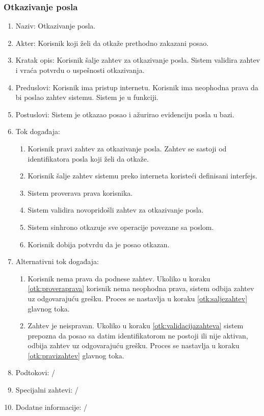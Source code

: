 \documentclass[12pt,oneside]{memoir}
\begin{document}
\subsubsection{Otkazivanje posla}
\begin{enumerate}
\item Naziv: Otkazivanje posla.
\item Akter: Korisnik koji želi da otkaže prethodno zakazani posao.
\item Kratak opis: Korisnik šalje zahtev za otkazivanje posla. Sistem validira zahtev i vraća potvrdu o uspešnosti otkazivanja.
\item Preduslovi: Korisnik ima pristup internetu. Korisnik ima neophodna prava da bi poslao zahtev sistemu. Sistem je u funkciji.
\item Postuslovi: Sistem je otkazao posao i ažurirao evidenciju posla u bazi.
\item Tok događaja:
	\begin{enumerate}
	\item \label{otk:pravizahtev} Korisnik pravi zahtev za otkazivanje posla. Zahtev se sastoji od identifikatora posla koji želi da otkaže.
	\item \label{otk:saljezahtev} Korisnik šalje zahtev sistemu preko interneta koristeći definisani interfejs.
	\item \label{otk:proveraprava} Sistem proverava prava korisnika.
	\item \label{otk:validacijazahteva} Sistem validira novopridošli zahtev za otkazivanje posla.
	\item \label{otk:sinhotkazivanje} Sistem sinhrono otkazuje sve operacije povezane sa poslom.
	\item Korisnik dobija potvrdu da je posao otkazan.
	\end{enumerate}
\item Alternativni tok događaja:
	\begin{enumerate}
	\item Korisnik nema prava da podnese zahtev. Ukoliko u koraku \ref{otk:proveraprava} korisnik nema neophodna prava, sistem odbija zahtev uz odgovarajuću grešku. Proces se nastavlja u koraku \ref{otk:saljezahtev} glavnog toka.
	\item Zahtev je neispravan. Ukoliko u koraku \ref{otk:validacijazahteva} sistem prepozna da posao sa datim identifikatorom ne postoji ili nije aktivan, odbija zahtev uz odgovarajuću grešku. Proces se nastavlja u koraku \ref{otk:pravizahtev} glavnog toka.
	\end{enumerate}
\item Podtokovi: /
\item Specijalni zahtevi: /
\item Dodatne informacije: /
\end{enumerate}
\end{document}
